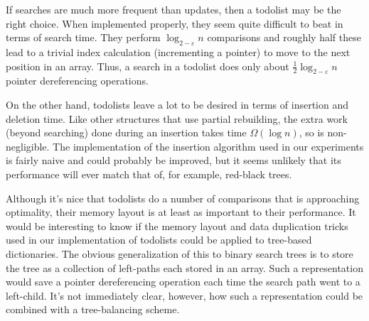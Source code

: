 \documentclass[lotsofwhite]{patmorin}
\newcommand{\eps}{\varepsilon}
\begin{document}
If searches are much more frequent than updates, then a todolist
may be the right choice.  When implemented properly, they seem quite
difficult to beat in terms of search time.  They perform $\log_{2-\eps}
n$ comparisons and roughly half these lead to a trivial index calculation
(incrementing a pointer) to move to the next position in an array. Thus,
a search in a todolist does only about $\frac{1}{2}\log_{2-\eps} n$
pointer dereferencing operations.

On the other hand, todolists leave a lot to be desired in terms of
insertion and deletion time.  Like other structures that use partial
rebuilding, the extra work (beyond searching) done during an insertion
takes time $\Omega(\log n)$, so is non-negligible.  The implementation of the insertion algorithm used in our experiments is fairly naive and could probably be improved, but it seems unlikely that its performance will ever match that of, for example, red-black trees.

Although it's nice that todolists do a number of comparisons that is
approaching optimality, their memory layout is at least as important to
their performance.  It would be interesting to know if the memory layout
and data duplication tricks used in our implementation of todolists could
be applied to tree-based dictionaries.  The obvious generalization of this
to binary search trees is to store the tree as a collection of left-paths
each stored in an array. Such a representation would save a pointer
dereferencing operation each time the search path went to a left-child.
It's not immediately clear, however, how such a representation could be
combined with a tree-balancing scheme.
\end{document}
